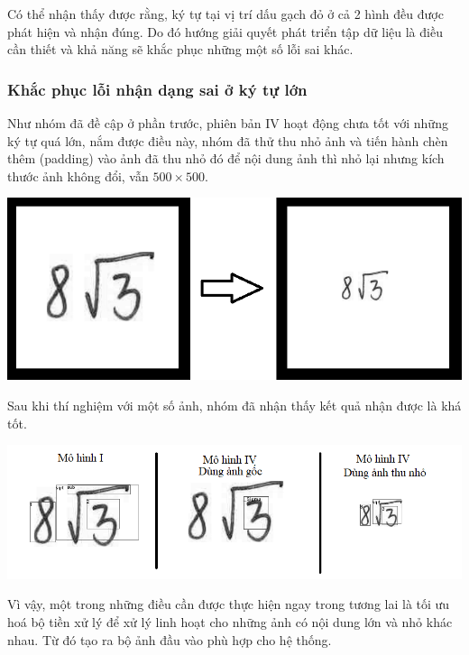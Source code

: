 \documentclass[a4paper]{article}
\theoremstyle{definition}
\begin{document}
	Có thể nhận thấy được rằng, ký tự tại vị trí dấu gạch đỏ ở cả 2 hình đều được phát hiện và nhận đúng. Do đó hướng giải quyết phát triển tập dữ liệu là điều cần thiết và khả năng sẽ khắc phục những một số lỗi sai khác. 
	\subsubsection{Khắc phục lỗi nhận dạng sai ở ký tự lớn}
	
	Như nhóm đã đề cập ở phần trước, phiên bản IV hoạt động chưa tốt với những ký tự quá lớn, nắm được điều này, nhóm đã thử thu nhỏ ảnh và tiến hành chèn thêm (padding) vào ảnh đã thu nhỏ đó để nội dung ảnh thì nhỏ lại nhưng kích thước ảnh không đổi, vẫn $500 \times 500$.
	
	\begin{center}
		\centering
		\includegraphics[width=0.775\linewidth]{ensmall.png}
		\vspace{0.5cm}
		
	\end{center}
	
	Sau khi thí nghiệm với một số ảnh, nhóm đã nhận thấy kết quả nhận được là khá tốt.
	
	\begin{center}
		\centering
		\includegraphics[width=0.875\linewidth]{compare_future.png}
		\vspace{0.5cm}
		
	\end{center}
	Vì vậy, một trong những điều cần được thực hiện ngay trong tương lai là tối ưu hoá bộ tiền xử lý để xử lý linh hoạt cho những ảnh có nội dung lớn và nhỏ khác nhau. Từ đó tạo ra bộ ảnh đầu vào phù hợp cho hệ thống.
	
\end{document}

